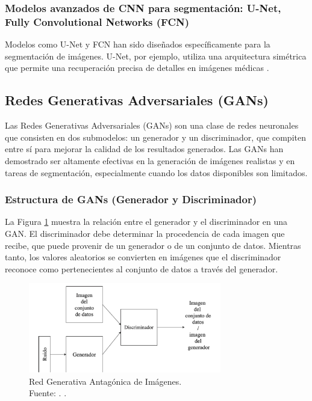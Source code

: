 \subsubsection{Modelos avanzados de CNN para segmentación: U-Net, Fully Convolutional Networks (FCN)}
Modelos como U-Net y FCN han sido diseñados específicamente para la segmentación de imágenes. U-Net, por ejemplo, utiliza una arquitectura simétrica que permite una recuperación precisa de detalles en imágenes médicas \parencite{ronneberger2015}.

\subsection{Redes Generativas Adversariales (GANs)}  
Las Redes Generativas Adversariales (GANs) son una clase de redes neuronales que consisten en dos submodelos: un generador y un discriminador, que compiten entre sí para mejorar la calidad de los resultados generados. Las GANs han demostrado ser altamente efectivas en la generación de imágenes realistas y en tareas de segmentación, especialmente cuando los datos disponibles son limitados.

\subsubsection{Estructura de GANs (Generador y Discriminador)}  
La Figura \ref{2:fig47} muestra la relación entre el generador y el discriminador en una GAN. El discriminador debe determinar la procedencia de cada imagen que recibe, que puede provenir de un generador o de un conjunto de datos. Mientras tanto, los valores aleatorios se convierten en imágenes que el discriminador reconoce como pertenecientes al conjunto de datos a través del generador. \parencite{tec_goodfellow2014gan}

\begin{figure}[!ht]
	\begin{center}
		\includegraphics[width=0.75\textwidth]{2/figures/redgan.jpg}
		\caption[Red Generativa Antagónica de Imágenes]{Red Generativa Antagónica de Imágenes.\\
		Fuente: \cite{tec_goodfellow2014gan}. .}
		\label{2:fig47}
	\end{center}
\end{figure}


